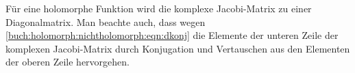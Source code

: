 Für eine holomorphe Funktion wird die komplexe Jacobi-Matrix zu
einer Diagonalmatrix.
Man beachte auch, dass
wegen \eqref{buch:holomorph:nichtholomorph:eqn:dkonj}
die Elemente der unteren Zeile der komplexen Jacobi-Matrix
durch Konjugation und Vertauschen aus den Elementen der oberen
Zeile hervorgehen.



